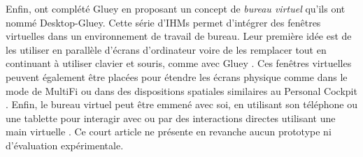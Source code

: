 Enfin, \cite{Serrano2015a} ont complété Gluey en proposant un concept de \emph{bureau virtuel} qu'ils ont nommé Desktop-Gluey. Cette série d'IHMs permet d'intégrer des fenêtres virtuelles dans un environnement de travail de bureau. Leur première idée est de les utiliser en parallèle d'écrans d'ordinateur voire de les remplacer tout en continuant à utiliser clavier et souris, comme avec Gluey . Ces fenêtres virtuelles peuvent également être placées pour étendre les écrans physique comme dans le mode  de MultiFi ou dans des dispositions spatiales similaires au Personal Cockpit . Enfin, le bureau virtuel peut être emmené avec soi, en utilisant son téléphone ou une tablette pour interagir avec ou par des interactions directes utilisant une main virtuelle . Ce court article ne présente en revanche aucun prototype ni d'évaluation expérimentale.


